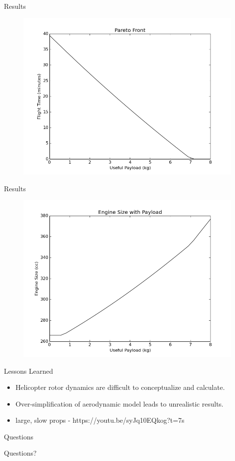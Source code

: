 \documentclass{beamer}
\begin{document}
\begin{frame}{Results}
	\begin{figure}
		\begin{center}
			\includegraphics[width=.70\textwidth]{../pareto_front.png}
			\label{fig:pareto}
		\end{center}
	\end{figure}
\end{frame}

\begin{frame}{Results}
	\begin{figure}
		\begin{center}
			\includegraphics[width=.70\textwidth]{../engine_size_vs_payload.png}
			\label{fig:pareto}
		\end{center}
	\end{figure}
\end{frame}

\begin{frame}{Lessons Learned}
	\begin{itemize}
		\item{Helicopter rotor dynamics are difficult to conceptualize and calculate.}
		\item{Over-simplification of aerodynamic model leads to unrealistic results.}
		\item{large, slow props - https://youtu.be/syJq10EQkog?t=7s}
		
	
	\end{itemize}
\end{frame}

\begin{frame}{Questions}
	
		\begin{center}
			Questions?
		\end{center}
	
\end{frame}
\end{document}
